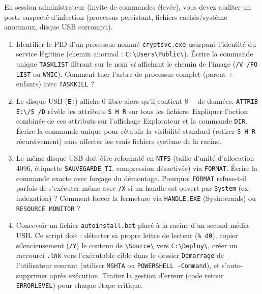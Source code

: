 \documentclass[11pt]{article}
\begin{document}
\begin{exercice}
En session administrateur (invite de commandes élevée), vous devez auditer un poste suspecté d'infection (processus persistant, fichiers cachés/système anormaux, disque USB corrompu).
\begin{enumerate}
    \item Identifier le PID d'un processus nommé \texttt{cryptsvc.exe} usurpant l'identité du service légitime (chemin anormal : \texttt{C:\textbackslash Users\textbackslash Public\textbackslash}). Écrire la commande unique \texttt{TASKLIST} filtrant sur le nom \textit{et} affichant le chemin de l'image (\texttt{/V /FO LIST} ou \texttt{WMIC}). Comment tuer l'arbre de processus complet (parent + enfants) avec \texttt{TASKKILL} ?
    \item Le disque USB (\texttt{E:}) affiche \SI{0}{\byte} libre alors qu'il contient \SI{8}{\giga\byte} de données. \texttt{ATTRIB E:\textbackslash* /S /D} révèle les attributs \texttt{S H R} sur tous les fichiers. Expliquer l'action combinée de ces attributs sur l'affichage Explorateur et la commande \texttt{DIR}. Écrire la commande unique pour rétablir la visibilité standard (retirer \texttt{S H R} récursivement) sans affecter les vrais fichiers système de la racine.
    \item Le même disque USB doit être reformaté en \texttt{NTFS} (taille d'unité d'allocation \SI{4096}{\byte}, étiquette \texttt{SAUVEGARDE\_TI}, compression désactivée) via \texttt{FORMAT}. Écrire la commande exacte avec forçage du démontage. Pourquoi \texttt{FORMAT} refuse-t-il parfois de s'exécuter même avec \texttt{/X} si un handle est ouvert par \texttt{System} (ex: indexation) ? Comment forcer la fermeture via \texttt{HANDLE.EXE} (Sysinternals) ou \texttt{RESOURCE MONITOR} ?
    \item Concevoir un fichier \texttt{autoinstall.bat} placé à la racine d'un second média USB. Ce script doit : détecter sa propre lettre de lecteur (\texttt{\%~d0}), copier silencieusement (\texttt{/Y}) le contenu de \texttt{\textbackslash Source\textbackslash} vers \texttt{C:\textbackslash Deploy\textbackslash}, créer un raccourci \texttt{.lnk} vers l'exécutable cible dans le dossier \texttt{Démarrage} de l'utilisateur courant (utiliser \texttt{MSHTA} ou \texttt{POWERSHELL -Command}), et s'auto-supprimer après exécution. Traiter la gestion d'erreur (code retour \texttt{ERRORLEVEL}) pour chaque étape critique.
\end{enumerate}
\end{exercice}
\end{document}
